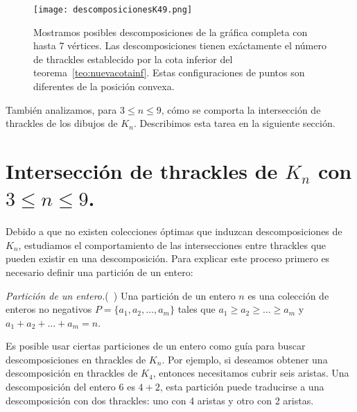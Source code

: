   \begin{figure}[htpb]
    \centering
    \texttt{[image: descomposicionesK49.png]}
    \caption{Mostramos posibles descomposiciones de la gráfica completa con
    hasta 7 vértices. Las descomposiciones tienen exáctamente el número de
    thrackles establecido por la cota inferior del
    teorema~\ref{teo:nuevacotainf}. Estas configuraciones de puntos son
    diferentes de la posición convexa.}
    \label{fig:descomposicionesk4_k9}
  \end{figure}

  También analizamos, para $ 3\leq n\leq 9$, cómo
  se comporta la intersección de thrackles de los dibujos de $K_n$. Describimos
  esta tarea en la siguiente sección.


  \section{Intersección de thrackles de $K_n$ con $3\leq n \leq 9$.}

    Debido a que no existen colecciones óptimas que induzcan descomposiciones de $K_n$,
    estudiamos el comportamiento de las intersecciones entre thrackles que pueden existir
    en una descomposición. Para explicar este proceso primero es
    necesario definir una partición de un entero:

    \begin{definition}{\emph{Partición de un entero.}(~\cite{Knuth2011})}
      Una partición de un entero $n$ es una colección de enteros
      no negativos $P = \{a_1, a_2, \dots, a_m\}$ tales que
      $a_1 \geq a_2\geq \dots \geq a_m$ y $a_1 + a_2 + \dots + a_m = n$.
    \end{definition}

    Es posible usar ciertas particiones de un entero como guía para buscar
    descomposiciones en thrackles de $K_n$. Por ejemplo, si  deseamos obtener
    una descomposición en thrackles de $K_4$, entonces necesitamos cubrir
    seis aristas. Una descomposición del entero 6 es $4+2$, esta partición puede
    traducirse a una descomposición con dos thrackles: uno con 4 aristas y otro
    con 2 aristas.

